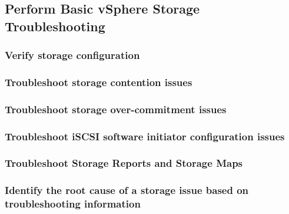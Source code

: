 \subsection{Perform Basic vSphere Storage Troubleshooting}

\subsubsection{Verify storage configuration}

\subsubsection{Troubleshoot storage contention issues}

\subsubsection{Troubleshoot storage over-commitment issues}

\subsubsection{Troubleshoot iSCSI software initiator configuration issues}

\subsubsection{Troubleshoot Storage Reports and Storage Maps}

\subsubsection{Identify the root cause of a storage issue based on troubleshooting information}
